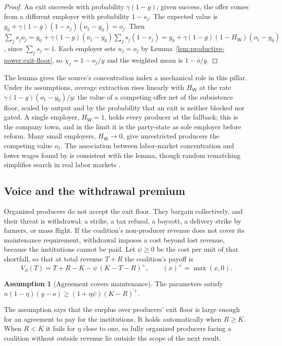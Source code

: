 \documentclass[11pt,letterpaper]{article}
\theoremstyle{definition}
\newtheorem{assumption}[theorem]{Assumption}
\theoremstyle{remark}
\newcommand{\pW}{\mathsf{W}}
\newcommand{\HW}{H_{\pW}}
\begin{document}
\begin{proof}
An exit succeeds with probability $\gamma(1-g)$; given success, the offer comes from a different employer with probability $1-s_j$. The expected value is $y_0+\gamma(1-g)(1-s_j)(o_1-y_0)=o_j$. Then $\sum_js_jo_j=y_0+\gamma(1-g)(o_1-y_0)\sum_j s_j(1-s_j)=y_0+\gamma(1-g)(1-\HW)(o_1-y_0)$, since $\sum_js_j=1$. Each employer sets $u_j=o_j$ by Lemma~\ref{lem:productive-power:exit-floor}, so $\chi_j=1-o_j/y$ and the weighted mean is $1-\bar o/y$.
\end{proof}

The lemma gives the source's concentration index a mechanical role in this pillar. Under its assumptions, average extraction rises linearly with $\HW$ at the rate $\gamma(1-g)(o_1-y_0)/y$: the value of a competing offer net of the subsistence floor, scaled by output and by the probability that an exit is neither blocked nor gated. A single employer, $\HW=1$, holds every producer at the fallback; this is the company town, and in the limit it is the party-state as sole employer before reform. Many small employers, $\HW\to 0$, give unrestricted producers the competing value $o_1$. The association between labor-market concentration and lower wages found by \citet{azar2022} is consistent with the lemma, though random rematching simplifies search in real labor markets \citep{manning2003}.

\subsection{Voice and the withdrawal premium}

Organized producers do not accept the exit floor. They bargain collectively, and their threat is withdrawal: a strike, a tax refusal, a boycott, a delivery strike by farmers, or mass flight. If the coalition's non-producer revenue does not cover its maintenance requirement, withdrawal imposes a cost beyond lost revenue, because the institutions cannot be paid. Let $\psi\ge 0$ be the cost per unit of that shortfall, so that at total revenue $T+R$ the coalition's payoff is
\[
V_S(T)=T+R-K-\psi\,(K-T-R)^+,\qquad (x)^+=\max(x,0).
\]

\begin{assumption}[Agreement covers maintenance]
\label{ass:productive-power:feasible}
The parameters satisfy $n(1-\eta)(y-o)\ge(1+\eta\psi)(K-R)^+$.
\end{assumption}

The assumption says that the surplus over producers' exit floor is large enough for an agreement to pay for the institutions. It holds automatically when $R\ge K$. When $R<K$ it fails for $\eta$ close to one, so fully organized producers facing a coalition without outside revenue lie outside the scope of the next result.
\end{document}
